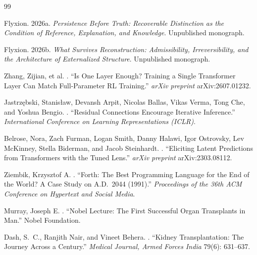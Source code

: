 \documentclass[11pt]{article}
\theoremstyle{plain}
\begin{document}
{\renewcommand{\refname}{}
\begin{thebibliography}{99}

Flyxion.
\newblock 2026a.
\newblock \emph{Persistence Before Truth: Recoverable Distinction as the Condition of Reference, Explanation, and Knowledge}.
\newblock Unpublished monograph.

Flyxion.
\newblock 2026b.
\newblock \emph{What Survives Reconstruction: Admissibility, Irreversibility, and the Architecture of Externalized Structure}.
\newblock Unpublished monograph.

Zhang, Zijian, et al.
.
\newblock ``Is One Layer Enough? Training a Single Transformer Layer Can Match Full-Parameter RL Training.''
\newblock \emph{arXiv preprint} arXiv:2607.01232.

Jastrz\k{e}bski, Stanis\l{}aw, Devansh Arpit, Nicolas Ballas, Vikas Verma, Tong Che, and Yoshua Bengio.
.
\newblock ``Residual Connections Encourage Iterative Inference.''
\newblock \emph{International Conference on Learning Representations (ICLR)}.

Belrose, Nora, Zach Furman, Logan Smith, Danny Halawi, Igor Ostrovsky, Lev McKinney, Stella Biderman, and Jacob Steinhardt.
.
\newblock ``Eliciting Latent Predictions from Transformers with the Tuned Lens.''
\newblock \emph{arXiv preprint} arXiv:2303.08112.

Ziembik, Krzysztof A.
.
\newblock ``Forth: The Best Programming Language for the End of the World? A Case Study on A.D.\ 2044 (1991).''
\newblock \emph{Proceedings of the 36th ACM Conference on Hypertext and Social Media}.

Murray, Joseph E.
.
\newblock ``Nobel Lecture: The First Successful Organ Transplants in Man.''
\newblock Nobel Foundation.

Dash, S.\ C., Ranjith Nair, and Vineet Behera.
.
\newblock ``Kidney Transplantation: The Journey Across a Century.''
\newblock \emph{Medical Journal, Armed Forces India} 79(6): 631--637.

\end{thebibliography}
}
\end{document}
